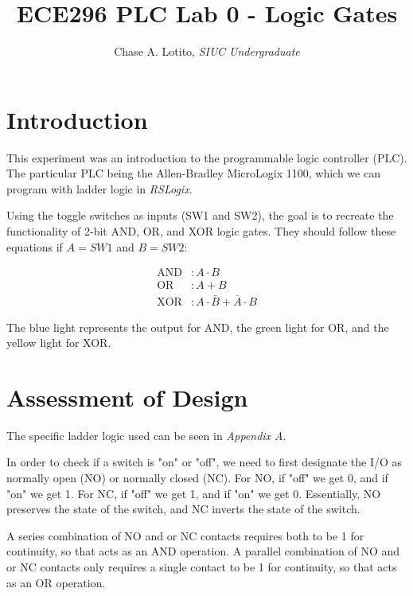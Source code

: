 \documentclass{IEEEtran}
\title{ECE296 PLC Lab 0 - Logic Gates}
\author{Chase A. Lotito, \textit{SIUC Undergraduate}}
\date{}
\begin{document}
\maketitle %

\section{Introduction} 

This experiment was an introduction to the programmable logic controller (PLC). The particular PLC being the Allen-Bradley MicroLogix 1100, which we can program with ladder logic in \textit{RSLogix}. 

Using the toggle switches as inputs (SW1 and SW2), the goal is to recreate the functionality of 2-bit AND, OR, and XOR logic gates. They should follow these equations if \(A = SW1\) and \(B = SW2\):

\begin{align}\label{eq:logicgates}
    \text{AND} &: A \cdot B \\
    \text{OR} &: A + B \\
    \text{XOR} &: A \cdot \bar{B} + \bar{A} \cdot B
\end{align}

The blue light represents the output for AND, the green light for OR, and the yellow light for XOR.

\section{Assessment of Design}

The specific ladder logic used can be seen in \textit{Appendix A}. 

In order to check if a switch is "on" or "off", we need to first designate the I/O as normally open (NO) or normally closed (NC). For NO, if "off" we get 0, and if "on" we get 1. For NC, if "off" we get 1, and if "on" we get 0. Essentially, NO preserves the state of the switch, and NC inverts the state of the switch.

A series combination of NO and or NC contacts requires both to be 1 for continuity, so that acts as an AND operation. A parallel combination of NO and or NC contacts only requires a single contact to be 1 for continuity, so that acts as an OR operation.
\end{document}
